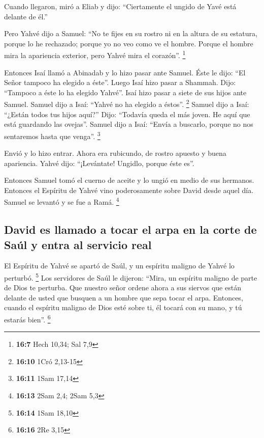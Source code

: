  Cuando llegaron, miró a Eliab y dijo: ``Ciertamente el
ungido de Yavé está delante de él.''

 Pero Yahvé dijo a Samuel: ``No te fijes en su rostro ni
en la altura de su estatura, porque lo he rechazado; porque yo no veo
como ve el hombre. Porque el hombre mira la apariencia exterior, pero
Yahvé mira el corazón''. \footnote{\textbf{16:7} Hech 10,34; Sal 7,9}

 Entonces Isaí llamó a Abinadab y lo hizo pasar ante
Samuel. Éste le dijo: ``El Señor tampoco ha elegido a éste''.
 Luego Isaí hizo pasar a Shammah. Dijo: ``Tampoco a éste
lo ha elegido Yahvé''.  Isaí hizo pasar a siete de sus
hijos ante Samuel. Samuel dijo a Isaí: ``Yahvé no ha elegido a éstos''.
\footnote{\textbf{16:10} 1Cró 2,13-15}  Samuel dijo a
Isaí: ``¿Están todos tus hijos aquí?'' Dijo: ``Todavía queda el más
joven. He aquí que está guardando las ovejas''. Samuel dijo a Isaí:
``Envía a buscarlo, porque no nos sentaremos hasta que venga''.
\footnote{\textbf{16:11} 1Sam 17,14}

 Envió y lo hizo entrar. Ahora era rubicundo, de rostro
apuesto y buena apariencia. Yahvé dijo: ``¡Levántate! Ungidlo, porque
éste es''.

 Entonces Samuel tomó el cuerno de aceite y lo ungió en
medio de sus hermanos. Entonces el Espíritu de Yahvé vino poderosamente
sobre David desde aquel día. Samuel se levantó y se fue a Ramá.
\footnote{\textbf{16:13} 2Sam 2,4; 2Sam 5,3}

\hypertarget{david-es-llamado-a-tocar-el-arpa-en-la-corte-de-sauxfal-y-entra-al-servicio-real}{%
\subsection{David es llamado a tocar el arpa en la corte de Saúl y entra
al servicio
real}\label{david-es-llamado-a-tocar-el-arpa-en-la-corte-de-sauxfal-y-entra-al-servicio-real}}

 El Espíritu de Yahvé se apartó de Saúl, y un espíritu
maligno de Yahvé lo perturbó. \footnote{\textbf{16:14} 1Sam 18,10}
 Los servidores de Saúl le dijeron: ``Mira, un espíritu
maligno de parte de Dios te perturba.  Que nuestro señor
ordene ahora a sus siervos que están delante de usted que busquen a un
hombre que sepa tocar el arpa. Entonces, cuando el espíritu maligno de
Dios esté sobre ti, él tocará con su mano, y tú estarás bien''.
\footnote{\textbf{16:16} 2Re 3,15}

